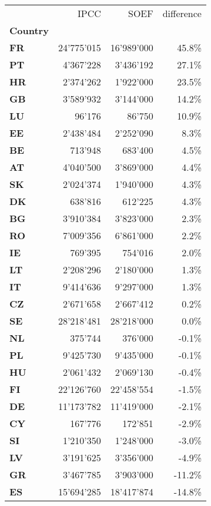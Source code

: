 \begin{tabular}{lrrr}
\toprule
{} &       IPCC &       SOEF & difference \\
\textbf{Country} &            &            &            \\
\midrule
\textbf{FR     } & 24'775'015 & 16'989'000 &      45.8\% \\
\textbf{PT     } &  4'367'228 &  3'436'192 &      27.1\% \\
\textbf{HR     } &  2'374'262 &  1'922'000 &      23.5\% \\
\textbf{GB     } &  3'589'932 &  3'144'000 &      14.2\% \\
\textbf{LU     } &     96'176 &     86'750 &      10.9\% \\
\textbf{EE     } &  2'438'484 &  2'252'090 &       8.3\% \\
\textbf{BE     } &    713'948 &    683'400 &       4.5\% \\
\textbf{AT     } &  4'040'500 &  3'869'000 &       4.4\% \\
\textbf{SK     } &  2'024'374 &  1'940'000 &       4.3\% \\
\textbf{DK     } &    638'816 &    612'225 &       4.3\% \\
\textbf{BG     } &  3'910'384 &  3'823'000 &       2.3\% \\
\textbf{RO     } &  7'009'356 &  6'861'000 &       2.2\% \\
\textbf{IE     } &    769'395 &    754'016 &       2.0\% \\
\textbf{LT     } &  2'208'296 &  2'180'000 &       1.3\% \\
\textbf{IT     } &  9'414'636 &  9'297'000 &       1.3\% \\
\textbf{CZ     } &  2'671'658 &  2'667'412 &       0.2\% \\
\textbf{SE     } & 28'218'481 & 28'218'000 &       0.0\% \\
\textbf{NL     } &    375'744 &    376'000 &      -0.1\% \\
\textbf{PL     } &  9'425'730 &  9'435'000 &      -0.1\% \\
\textbf{HU     } &  2'061'432 &  2'069'130 &      -0.4\% \\
\textbf{FI     } & 22'126'760 & 22'458'554 &      -1.5\% \\
\textbf{DE     } & 11'173'782 & 11'419'000 &      -2.1\% \\
\textbf{CY     } &    167'776 &    172'851 &      -2.9\% \\
\textbf{SI     } &  1'210'350 &  1'248'000 &      -3.0\% \\
\textbf{LV     } &  3'191'625 &  3'356'000 &      -4.9\% \\
\textbf{GR     } &  3'467'785 &  3'903'000 &     -11.2\% \\
\textbf{ES     } & 15'694'285 & 18'417'874 &     -14.8\% \\
\bottomrule
\end{tabular}
